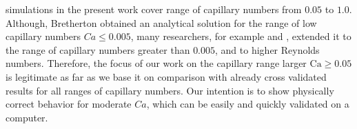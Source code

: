 \documentclass[preprint,12pt]{elsarticle}
\newcommand{\Ca}{\mathrm{Ca}}
\begin{document}
simulations in the present work cover range of capillary numbers from $0.05$ to $1.0$.
Although, Bretherton obtained an analytical solution for the range of low capillary
numbers $Ca \leq 0.005$, many researchers, for example \citet{giavedoni-numerical} and
\citet{heil-bretherton}, extended it to the range of capillary numbers
greater than
$0.005$, and to higher Reynolds numbers. %
Therefore, the focus of our work on the capillary range larger $\Ca\geq0.05$ is legitimate as far
as we base it on comparison with already cross validated
results for all ranges of capillary numbers.  Our intention is
  to show physically correct behavior for moderate $Ca$,
which
  can be easily and quickly validated on a computer.
\end{document}
